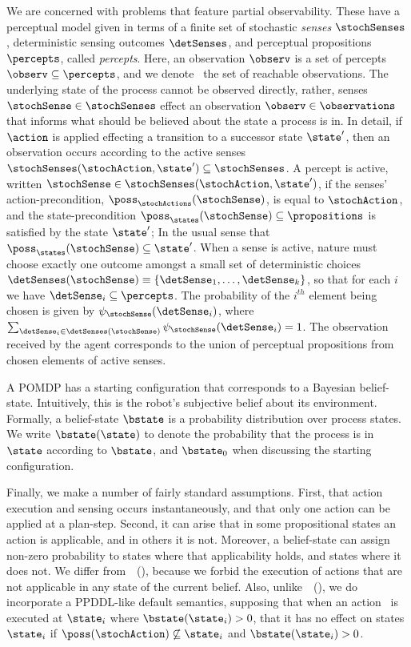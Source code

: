 \documentclass[letterpaper]{article}
\begin{document}
We are concerned with problems that feature partial
observability. These have a perceptual model given in terms of a
finite set of stochastic {\em senses} $\stochSenses$, deterministic
sensing outcomes $\detSenses$, and perceptual propositions
$\percepts$, called {\em percepts}. Here, an observation $\observ$ is
a set of percepts $\observ \subseteq \percepts$, and we denote
\observations\ the set of reachable observations. The underlying state
of the process cannot be observed directly, rather, senses
$\stochSense \in \stochSenses$ effect an observation $\observ \in
\observations$ that informs what should be believed about the state a
process is in. In detail, if $\action$ is applied effecting a
transition to a successor state $\state'$, then an observation occurs
according to the active senses $\stochSenses(\stochAction, \state')
\subseteq \stochSenses$. A percept is active, written $\stochSense \in
\stochSenses(\stochAction, \state')$, if the senses'
action-precondition, $\poss_\stochActions(\stochSense)$, is equal to
$\stochAction$, and the state-precondition $\poss_\states(\stochSense)
\subseteq \propositions$ is satisfied by the state $\state'$; In the
usual sense that $\poss_\states(\stochSense) \subseteq \state'$.
When a sense is active, nature must choose exactly one outcome amongst
a small set of deterministic choices $\detSenses(\stochSense)
\equiv \{\detSense_1, \ldots, \detSense_k \}$, so that for each
$i$ we have $\detSense_i \subseteq \percepts$. The probability of
the $i^{th}$ element being chosen is given by
$\psi_{\stochSense}(\detSense_i)$, where $\sum_{\detSense_i \in
\detSenses(\stochSense)} \psi_{\stochSense}(\detSense_i) =
1$. The observation received by the agent corresponds to the union of
perceptual propositions from chosen elements of active senses.

A POMDP has a starting configuration that corresponds to a Bayesian
belief-state. Intuitively, this is the robot's subjective belief about
its environment. Formally, a belief-state $\bstate$ is a probability
distribution over process states. We write $\bstate(\state)$ to denote
the probability that the process is in $\state$ according to
$\bstate$, and $\bstate_0$ when discussing the starting
configuration. 

Finally, we make a number of fairly standard assumptions. First, that
action execution and sensing occurs instantaneously, and that only one
action can be applied at a plan-step. Second, it can arise that in
some propositional states an action is applicable, and in others it is
not. Moreover, a belief-state can assign non-zero probability to
states where that applicability holds, and states where it does
not. We differ
from~\citeauthor{younes:littman:04}~(\citeyear{younes:littman:04}),
because we forbid the execution of actions that are not applicable in
any state of the current belief.  Also,
unlike~\citeauthor{hoffmann:brafman:2006}~(\citeyear{hoffmann:brafman:2006}),
we do incorporate a PPDDL-like default semantics, supposing that when
an action \stochAction\ is executed at $\state_i$ where
$\bstate(\state_i) > 0$, that it has no effect on states $\state_i$ if
$\poss(\stochAction) \not\subseteq \state_i$ and $\bstate(\state_i) >
0$.
\end{document}
